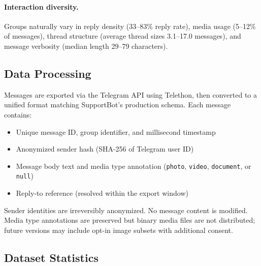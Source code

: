 \documentclass[11pt]{article}
\begin{document}
\paragraph{Interaction diversity.} Groups naturally vary in reply density (33--83\% reply rate), media usage (5--12\% of messages), thread structure (average thread sizes 3.1--17.0 messages), and message verbosity (median length 29--79 characters).

\subsection{Data Processing}

Messages are exported via the Telegram API using Telethon, then converted to a unified format matching SupportBot's production schema. Each message contains:
\begin{itemize}
    \item Unique message ID, group identifier, and millisecond timestamp
    \item Anonymized sender hash (SHA-256 of Telegram user ID)
    \item Message body text and media type annotation (\texttt{photo}, \texttt{video}, \texttt{document}, or \texttt{null})
    \item Reply-to reference (resolved within the export window)
\end{itemize}

Sender identities are irreversibly anonymized. No message content is modified. Media type annotations are preserved but binary media files are not distributed; future versions may include opt-in image subsets with additional consent.

\subsection{Dataset Statistics}
\end{document}
